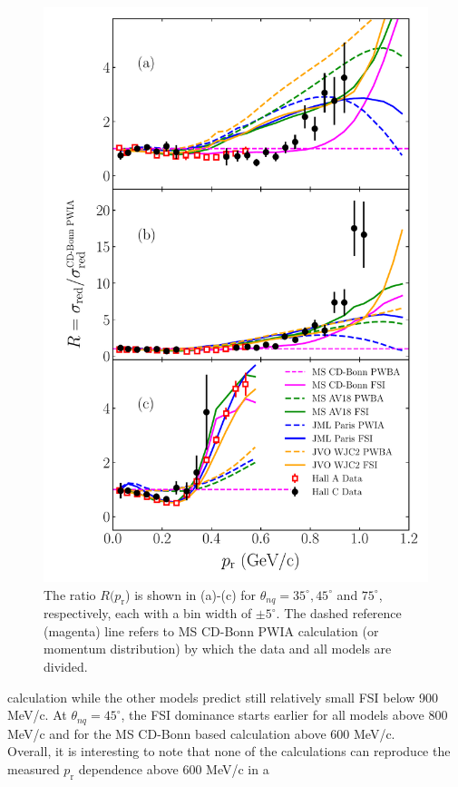 \begin{figure}[!t]
\includegraphics[scale=0.5]{./prl_plots/PRL_plot2.pdf}
\caption{The ratio $R(p_{\mathrm{r}}$) is shown in (a)-(c) for $\theta_{nq}=35^{\circ}, 45^{\circ}$ and $75^{\circ}$, respectively, each with a bin width of $\pm 5^{\circ}$.
The dashed reference (magenta) line refers to MS CD-Bonn PWIA calculation (or momentum distribution) by which the data and all models are divided.}
\label{fig:fig2}
\end{figure}
calculation while the other models predict still relatively small FSI below 900 MeV/c.
At $\theta_{nq}=45^{\circ}$, the FSI dominance starts earlier for all models above 800 MeV/c and for the MS CD-Bonn based calculation above 600 MeV/c. \\
\indent Overall, it is interesting to note that none of the calculations can reproduce the measured $p_{\mathrm{r}}$ dependence above 600 MeV/c in a
